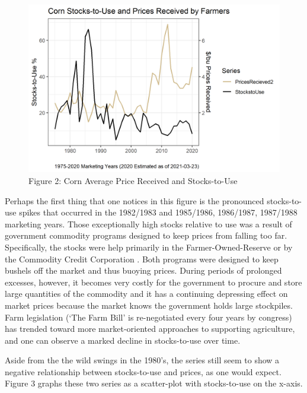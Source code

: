 \documentclass[
]{book}
\begin{document}
\begin{figure}
\centering
\includegraphics{assets/EndingStocksand-StocksUsePrices.png}
\caption{Figure 2: Corn Average Price Received and Stocks-to-Use}
\end{figure}

Perhaps the first thing that one notices in this figure is the pronounced stocks-to-use spikes that occurred in the 1982/1983 and 1985/1986, 1986/1987, 1987/1988 marketing years. Those exceptionally high stocks relative to use was a result of government commodity programs designed to keep prices from falling too far. Specifically, the stocks were help primarily in the Farmer-Owned-Reserve or by the Commodity Credit Corporation \citep{westcott_price_1999}. Both programs were designed to keep bushels off the market and thus buoying prices. During periods of prolonged excesses, however, it becomes very costly for the government to procure and store large quantities of the commodity and it has a continuing depressing effect on market prices because the market knows the government holds large stockpiles. Farm legislation (`The Farm Bill' is re-negotiated every four years by congress) has trended toward more market-oriented approaches to supporting agriculture, and one can observe a marked decline in stocks-to-use over time.

Aside from the the wild swings in the 1980's, the series still seem to show a negative relationship between stocks-to-use and prices, as one would expect. Figure 3 graphs these two series as a scatter-plot with stocks-to-use on the x-axis.
\end{document}
